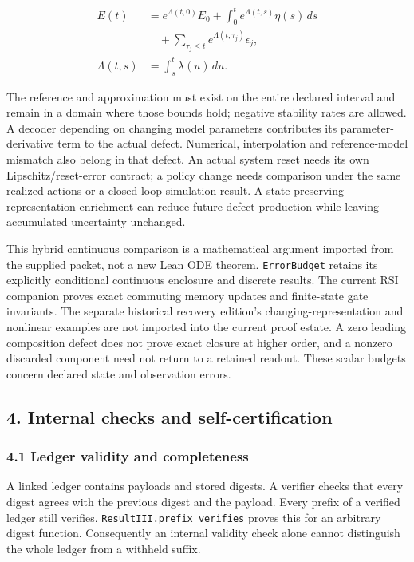 \documentclass[
  10pt,
]{article}
\begin{document}
\protect\hypertarget{math-E0040-0043}{}{\[
\begin{aligned}
E(t)&=e^{\Lambda(t,0)}E_0+
\int_0^t e^{\Lambda(t,s)}\eta(s)\,ds\\
&\quad+\sum_{\tau_j\le t}e^{\Lambda(t,\tau_j)}\epsilon_j,\\
\Lambda(t,s)&=\int_s^t\lambda(u)\,du.
\end{aligned}
\]}

The reference and approximation must exist on the entire declared interval and remain in a domain where those bounds hold; negative stability rates are allowed. A decoder depending on changing model parameters contributes its parameter-derivative term to the actual defect. Numerical, interpolation and reference-model mismatch also belong in that defect. An actual system reset needs its own Lipschitz/reset-error contract; a policy change needs comparison under the same realized actions or a closed-loop simulation result. A state-preserving representation enrichment can reduce future defect production while leaving accumulated uncertainty unchanged.

This hybrid continuous comparison is a mathematical argument imported from the supplied packet, not a new Lean ODE theorem. \texttt{ErrorBudget} retains its explicitly conditional continuous enclosure and discrete results. The current RSI companion proves exact commuting memory updates and finite-state gate invariants. The separate historical recovery edition's changing-representation and nonlinear examples are not imported into the current proof estate. A zero leading composition defect does not prove exact closure at higher order, and a nonzero discarded component need not return to a retained readout. These scalar budgets concern declared state and observation errors.

\subsection{4. Internal checks and self-certification}\label{internal-checks-and-self-certification}

\subsubsection{4.1 Ledger validity and completeness}\label{ledger-validity-and-completeness}

A linked ledger contains payloads and stored digests. A verifier checks that every digest agrees with the previous digest and the payload. Every prefix of a verified ledger still verifies. \texttt{ResultIII.prefix\_verifies} proves this for an arbitrary digest function. Consequently an internal validity check alone cannot distinguish the whole ledger from a withheld suffix.
\end{document}
